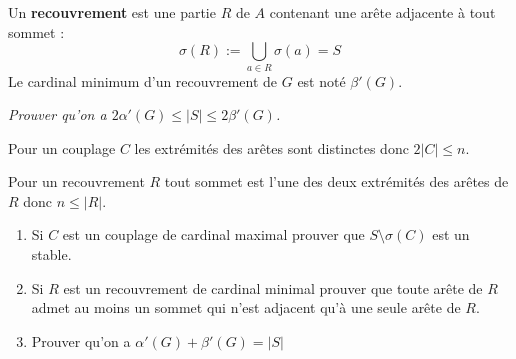 \smallskip

Un {\bf recouvrement} est une partie $R$ de $A$ contenant une arête adjacente à tout sommet : 
\[\sigma(R) := \bigcup_{a \in R} \sigma(a)=S\]
Le cardinal minimum d'un recouvrement de $G$ est noté $\beta'(G)$.
\begin{Exercise}[title=Comparaisons]\it 
Prouver qu'on a $2\alpha'(G) \le |S| \le 2\beta'(G)$.
\end{Exercise}
\begin{Answer}

Pour un couplage $C$ les extrémités des arêtes sont distinctes donc $2|C| \le n$.

Pour un recouvrement $R$ tout sommet est l'une des deux extrémités des arêtes de $R$ donc $n \le |R|$.
\end{Answer}
\begin{Exercise}[title=Théorème de Gallai]\it 
\begin{enumerate}
\item Si $C$ est un couplage de cardinal maximal prouver que $S\setminus \sigma(C)$ est un stable.
\item Si $R$ est un recouvrement de cardinal minimal prouver que toute arête de $R$ admet au moins un sommet qui n'est adjacent qu'à une seule arête de $R$.
\item Prouver qu'on a $\alpha'(G)+\beta'(G)=|S|$
\end{enumerate}
\end{Exercise}
